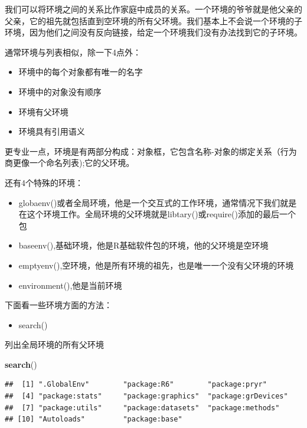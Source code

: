 \documentclass[]{book}
\newenvironment{Shaded}{\begin{snugshade}}{\end{snugshade}}
\newcommand{\KeywordTok}[1]{\textcolor[rgb]{0.13,0.29,0.53}{\textbf{#1}}}
\newcommand{\NormalTok}[1]{#1}
\providecommand{\tightlist}{%
  \setlength{\itemsep}{0pt}\setlength{\parskip}{0pt}}
\begin{document}
我们可以将环境之间的关系比作家庭中成员的关系。一个环境的爷爷就是他父亲的父亲，它的祖先就包括直到空环境的所有父环境。我们基本上不会说一个环境的子环境，因为他们之间没有反向链接，给定一个环境我们没有办法找到它的子环境。

通常环境与列表相似，除一下4点外：

\begin{itemize}
\item
  环境中的每个对象都有唯一的名字
\item
  环境中的对象没有顺序
\item
  环境有父环境
\item
  环境具有引用语义
\end{itemize}

更专业一点，环境是有两部分构成：对象框，它包含名称-对象的绑定关系（行为商更像一个命名列表);它的父环境。

还有4个特殊的环境：

\begin{itemize}
\item
  globaenv()或者全局环境，他是一个交互式的工作环境，通常情况下我们就是在这个环境工作。全局环境的父环境就是libtary()或require()添加的最后一个包
\item
  baseenv(),基础环境，他是R基础软件包的环境，他的父环境是空环境
\item
  emptyenv(),空环境，他是所有环境的祖先，也是唯一一个没有父环境的环境
\item
  environment(),他是当前环境
\end{itemize}

下面看一些环境方面的方法：

\begin{itemize}
\tightlist
\item
  search()
\end{itemize}

列出全局环境的所有父环境

\begin{Shaded}
\begin{Highlighting}[]
\KeywordTok{search}\NormalTok{()}
\end{Highlighting}
\end{Shaded}

\begin{verbatim}
##  [1] ".GlobalEnv"        "package:R6"        "package:pryr"     
##  [4] "package:stats"     "package:graphics"  "package:grDevices"
##  [7] "package:utils"     "package:datasets"  "package:methods"  
## [10] "Autoloads"         "package:base"
\end{verbatim}
\end{document}
